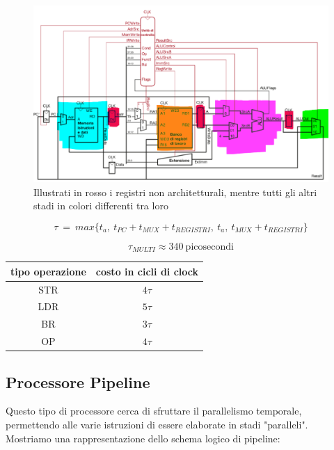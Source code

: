 \documentclass{article}
\begin{document}
\begin{figure}[htbp]
        \center
        \includegraphics[scale=0.45]{img/implementazione_multi_cycle.png}
        \caption{Illustrati in rosso i registri non architetturali, mentre tutti gli altri stadi in colori differenti tra loro}
    \end{figure}

\vspace*{5px}

\[ \tau \: = \: max\{ t_a,\: t_{PC}+t_{MUX}+t_{REGISTRI},\: t_{a},\: t_{MUX}+t_{REGISTRI}  \} \]

\[ \tau_{MULTI} \approx 340 \: \text{picosecondi} \]

\vspace*{20px}

\begin{center}
\begin{tabular}{ |c|c| } %
 \hline
  tipo operazione & costo in cicli di clock \\
  \hline
  STR & $4\tau$ \\
  LDR & $5\tau$ \\
  BR & $3\tau$ \\
  OP & $4\tau$ \\
 \hline
\end{tabular}
\end{center}

\newpage

\subsection{Processore Pipeline}

Questo tipo di processore cerca di sfruttare il parallelismo temporale, permettendo alle varie istruzioni di essere elaborate in stadi "paralleli". Mostriamo una rappresentazione dello schema logico di pipeline:
\end{document}
